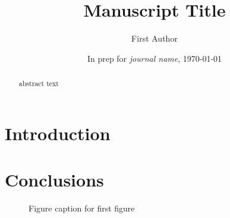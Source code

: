 \documentclass[agums]{aguplus}  %
\begin{document}

\title{Manuscript Title}


\author{First Author}
\author{In prep for {\it journal name}, \today}  %

\begin{abstract}
abstract text

\noindent
\end{abstract}

\section{Introduction}




\section{Conclusions}


\begin{figure}
\caption[]{Figure caption for first figure}
\label{n_massloss}
\end{figure}
\end{document}
